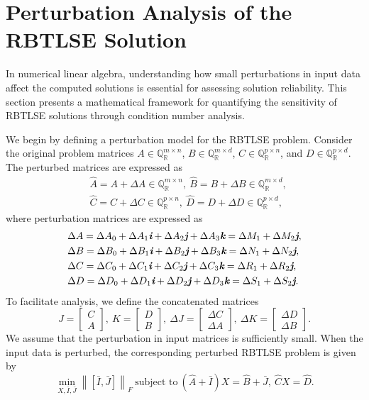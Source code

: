 \documentclass[preprint,11pt,3p]{elsarticle}
\newcommand\norm[1]{\left\lVert#1\right\rVert}
\def \QR{\mathbb{Q}_\mathbb{R}}
\def \i{\textit{\textbf{i}}}
\def \j{\textit{\textbf{j}}}
\def \k{\textit{\textbf{k}}}
\begin{document}
\section{Perturbation Analysis of the RBTLSE Solution}\label{sec5}
In numerical linear algebra, understanding how small perturbations in input data affect the computed solutions is essential for assessing solution reliability. This section presents a mathematical framework for quantifying the sensitivity of RBTLSE solutions through condition number analysis.

We begin by defining a perturbation model for the RBTLSE problem. Consider the original problem matrices 
$A \in \QR^{m \times n}$, $B \in \QR^{m \times d}$, $C \in \QR^{p \times n}$, and $D \in \QR^{p \times d}$.
The perturbed matrices are expressed as
\begin{eqnarray}
	&\widehat{A} =A+\Delta A  \in \QR^{m \times n}, ~  \widehat{B} = B+\Delta B  \in \QR^{m \times d}, \label{eq5.1} \\
	&\widehat{C} = C+\Delta C  \in \QR^{p \times n}, ~  \widehat{D} = D+\Delta D  \in \QR^{p \times d}, \label{eq5.2}
\end{eqnarray}	
where perturbation matrices are expressed as
\begin{eqnarray*}
	&\Delta A=\Delta A_0+\Delta A_1 \i +\Delta A_2 \j + \Delta A_3 \k =\Delta M_1 + \Delta M_2 \j, \\
	&\Delta B=\Delta B_0+\Delta B_1 \i +\Delta B_2 \j + \Delta B_3 \k = \Delta N_1 + \Delta N_2 \j,  \\
	& \Delta C=\Delta C_0+\Delta C_1 \i +\Delta C_2 \j + \Delta C_3 \k = \Delta R_1 + \Delta R_2 \j,  \\ 
	&\Delta D=\Delta D_0+\Delta D_1 \i +\Delta D_2 \j + \Delta D_3 \k = \Delta S_1 + \Delta S_2 \j.
\end{eqnarray*}
To facilitate analysis, we define the concatenated matrices
\begin{equation}\label{eq5.3}
J = \begin{bmatrix}
		C \\
		A
	\end{bmatrix}, ~ K = \begin{bmatrix}
	D \\
	B
\end{bmatrix}, ~ \Delta J = \begin{bmatrix}
\Delta C \\
\Delta A
\end{bmatrix}, ~ \Delta K = \begin{bmatrix}
\Delta D \\
\Delta B
\end{bmatrix}.
\end{equation}
We assume that the perturbation in input matrices is sufficiently small. When the input data is perturbed, the corresponding perturbed RBTLSE problem is given by
\begin{equation}\label{eq5.5}
	\min_{X,\bar{I},\bar{J}}\norm{[\bar{I}, \bar{J}]}_F ~ \textrm{subject to} ~  (\widehat{A}+\bar{I})X = \widehat{B}+\bar{J}, ~ \widehat{C}X=\widehat{D}. 
\end{equation}
\end{document}
